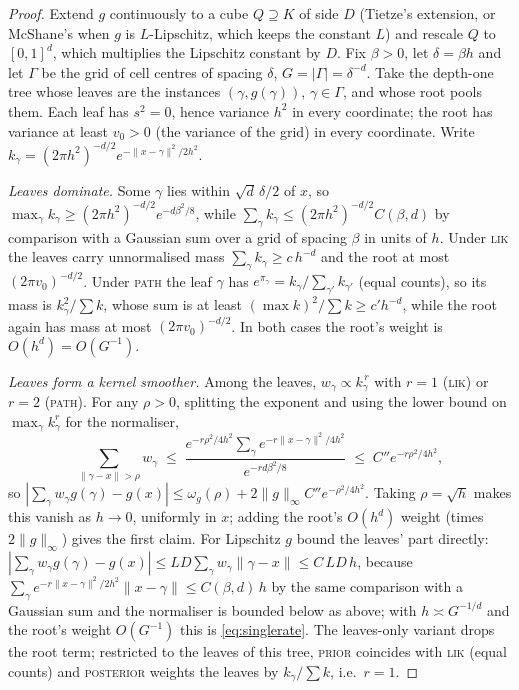 \documentclass[11pt]{article}
\theoremstyle{definition}
\theoremstyle{remark}
\begin{document}
\begin{proof}
Extend $g$ continuously to a cube $Q\supseteq K$ of side $D$ (Tietze's extension, or
McShane's when $g$ is $L$-Lipschitz, which keeps the constant $L$) and rescale $Q$ to
$[0,1]^d$, which multiplies the Lipschitz constant by $D$.
Fix $\beta>0$, let $\delta=\beta h$ and let $\Gamma$ be the grid of cell centres of
spacing $\delta$, $G=|\Gamma|=\delta^{-d}$.  Take the depth-one tree whose leaves are
the instances $(\gamma,g(\gamma))$, $\gamma\in\Gamma$, and whose root pools them.  Each
leaf has $s^2=0$, hence variance $h^2$ in every coordinate; the root has variance at
least $v_0>0$ (the variance of the grid) in every coordinate.  Write
$k_\gamma=(2\pi h^2)^{-d/2}e^{-\|x-\gamma\|^2/2h^2}$.

\emph{Leaves dominate.}  Some $\gamma$ lies within $\sqrt d\,\delta/2$ of $x$, so
$\max_\gamma k_\gamma\ge(2\pi h^2)^{-d/2}e^{-d\beta^2/8}$, while
$\sum_\gamma k_\gamma\le(2\pi h^2)^{-d/2}C(\beta,d)$ by comparison with a Gaussian sum
over a grid of spacing $\beta$ in units of $h$.  Under \textsc{lik} the leaves carry
unnormalised mass $\sum_\gamma k_\gamma\ge c\,h^{-d}$ and the root at most
$(2\pi v_0)^{-d/2}$.  Under \textsc{path} the leaf $\gamma$ has
$e^{\pi_\gamma}=k_\gamma/\sum_{\gamma'}k_{\gamma'}$ (equal counts), so its mass is
$k_\gamma^2/\sum k$, whose sum is at least $(\max k)^2/\sum k\ge c'h^{-d}$, while the root
again has mass at most $(2\pi v_0)^{-d/2}$.  In both cases the root's weight is
$O(h^d)=O(G^{-1})$.

\emph{Leaves form a kernel smoother.}  Among the leaves, $w_\gamma\propto k_\gamma^{\,r}$
with $r=1$ (\textsc{lik}) or $r=2$ (\textsc{path}).  For any $\rho>0$, splitting the
exponent and using the lower bound on $\max_\gamma k_\gamma^r$ for the normaliser,
\[
\sum_{\|\gamma-x\|>\rho}w_\gamma\;\le\;
\frac{e^{-r\rho^2/4h^2}\sum_\gamma e^{-r\|x-\gamma\|^2/4h^2}}{e^{-rd\beta^2/8}}
\;\le\;C''e^{-r\rho^2/4h^2},
\]
so $|\sum_\gamma w_\gamma g(\gamma)-g(x)|\le\omega_g(\rho)+2\|g\|_\infty C''e^{-\rho^2/4h^2}$.
Taking $\rho=\sqrt h$ makes this vanish as $h\to0$, uniformly in $x$; adding the root's
$O(h^d)$ weight (times $2\|g\|_\infty$) gives the first claim.  For Lipschitz $g$ bound
the leaves' part directly: $|\sum_\gamma w_\gamma g(\gamma)-g(x)|\le
LD\sum_\gamma w_\gamma\|\gamma-x\|\le C\,LD\,h$, because
$\sum_\gamma e^{-r\|x-\gamma\|^2/2h^2}\|x-\gamma\|\le C(\beta,d)\,h$ by the same comparison
with a Gaussian sum and the normaliser is bounded below as above; with $h\asymp G^{-1/d}$
and the root's weight $O(G^{-1})$ this is \eqref{eq:singlerate}.  The leaves-only
variant drops the root term; restricted to the leaves of this tree, \textsc{prior}
coincides with \textsc{lik} (equal counts) and \textsc{posterior} weights the leaves by
$k_\gamma/\sum k$, i.e.\ $r=1$.
\end{proof}
\end{document}
